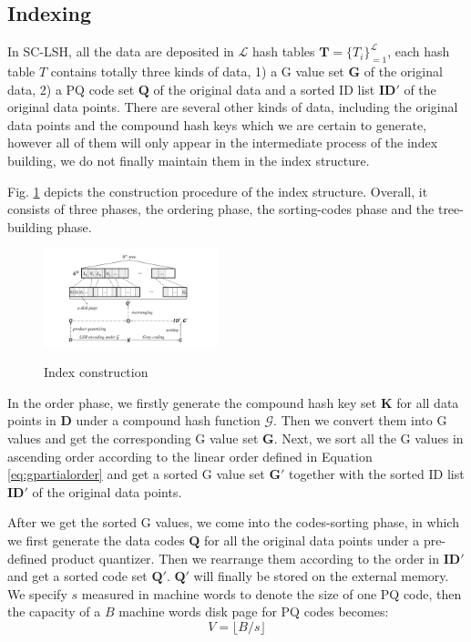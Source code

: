 \documentclass[twocolumn]{svjour3}          %
\begin{document}
\subsection{Indexing}\label{ssec:indexing}
In SC-LSH, all the data are deposited in $\mathcal{L}$ hash tables $\textbf{T}=\{T_i\}_{=1}^{\mathcal{L}}$, each hash table $T$ contains totally three kinds of data, 1) a G value set $\textbf{G}$ of the original data, 2) a PQ code set $\textbf{Q}$ of the original data and a sorted ID list $\textbf{ID}'$ of the original data points. There are several other kinds of data, including the original data points and the compound hash keys which we are certain to generate, however all of them will only appear in the intermediate process of the index building, we do not finally maintain them in the index structure.

Fig. \ref{fig:indexing} depicts the construction procedure of the index structure. Overall, it consists of three phases, the ordering phase, the sorting-codes phase and the tree-building phase.
\begin{figure}
  \centering
  \includegraphics[width=0.45\textwidth]{indexing.pdf}\\
  \caption{Index construction}\label{fig:indexing}
\end{figure}

In the order phase, we firstly generate the compound hash key set $\textbf{K}$ for all data points in $\textbf{D}$ under a compound hash function $\mathcal{G}$. Then we convert them into G values and get the corresponding G value set $\textbf{G}$. Next, we sort all the G values in ascending order according to the linear order defined in Equation \ref{eq:gpartialorder} and get a sorted G value set $\textbf{G}'$ together with the sorted ID list $\textbf{ID}'$ of the original data points.

After we get the sorted G values, we come into the codes-sorting phase, in which we first generate the data codes $\textbf{Q}$ for all the original data points under a pre-defined product quantizer. Then we rearrange them according to the order in $\textbf{ID}'$ and get a sorted code set $\textbf{Q}'$. $\textbf{Q}'$ will finally be stored on the external memory. We specify $s$ measured in machine words to denote the size of one PQ code, then the capacity of a $B$ machine words disk page for PQ codes becomes:
\begin{equation}\label{eq:vq}
V=\lfloor B/s \rfloor
\end{equation}
\end{document}

